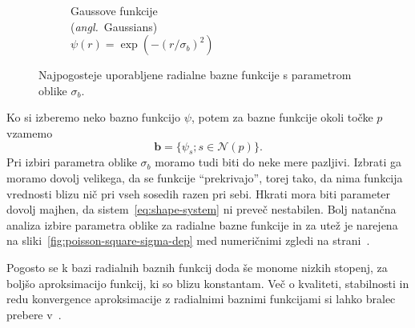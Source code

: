 \documentclass[12pt,a4paper,twoside]{article}
\theoremstyle{definition} %
\theoremstyle{plain} %
\numberwithin{equation}{section}
\newcommand{\Nc}{\mathcal{N}}
\renewcommand{\b}{\boldsymbol}
\newcommand{\ang}[1]{(\textit{angl.}\ #1)}
\begin{document}
\begin{figure}[h]
\begin{subfigure}[t]{0.32\textwidth}
    \caption[Gaussove funkcije]{Gaussove funkcije \\ \ang{Gaussians} \\ $\psi(r) = \exp(-(r/\sigma_b)^2)$}
  \end{subfigure}
  \caption[Najpogosteje uporabljene radialne bazne funkcije]{Najpogosteje uporabljene radialne bazne
  funkcije s parametrom oblike $\sigma_b$.}
  \label{fig:rbf}
\end{figure}


Ko si izberemo neko bazno funkcijo $\psi$, potem za bazne funkcije okoli točke
$p$ vzamemo
\[
  \b b = \{\psi_s; s \in \Nc(p) \}.
\]
Pri izbiri parametra oblike $\sigma_b$ moramo tudi biti do neke mere pazljivi. Izbrati
ga moramo dovolj velikega, da se funkcije ``prekrivajo'', torej tako, da nima
funkcija vrednosti blizu nič pri vseh sosedih razen pri sebi. Hkrati mora biti
parameter dovolj majhen, da sistem~\eqref{eq:shape-system} ni preveč nestabilen.
Bolj natančna analiza izbire parametra oblike za radialne bazne funkcije in
za utež je narejena na sliki~\ref{fig:poisson-square-sigma-dep} med numeričnimi
zgledi na strani~\pageref{fig:poisson-square-sigma-dep}.

Pogosto se k bazi radialnih baznih funkcij doda še monome nizkih stopenj, za
boljšo aproksimacijo funkcij, ki so blizu konstantam. Več o kvaliteti,
stabilnosti in redu konvergence aproksimacije z radialnimi baznimi funkcijami
si lahko bralec prebere v~\cite{buhmann2000radial}.
\end{document}
